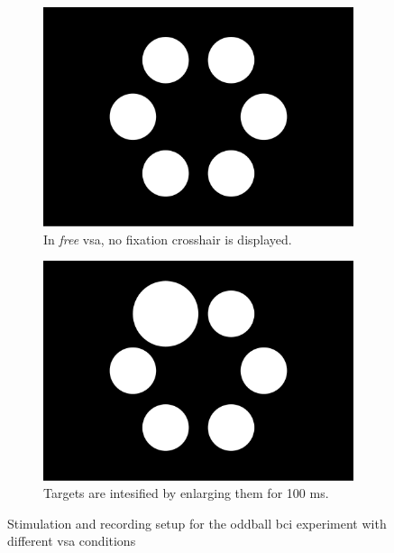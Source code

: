 \documentclass[twocolumn]{article}
\begin{document}
\begin{figure}[t]
\begin{minipage}[b]{.54\textwidth}
     \begin{subfigure}[b]{.45\linewidth}
      \includegraphics[width=\textwidth]{figures/stim_free.pdf}
       \caption{In \emph{free} \ac{vsa}, no fixation crosshair is displayed.}
    \end{subfigure}\hfill%
     \begin{subfigure}[b]{.45\linewidth}
      \includegraphics[width=\textwidth]{figures/stim_intense.pdf}
      \caption{Targets are intesified by enlarging them for 100 ms.}
    \end{subfigure}
  \end{minipage}

  \caption{Stimulation and recording setup for the oddball \ac{bci} experiment
  with different \ac{vsa} conditions}
  \label{fig:methods/stimulation/stimulation}
\end{figure}
\end{document}
